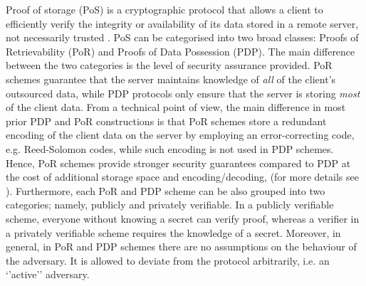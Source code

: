 Proof of storage (PoS) is a cryptographic protocol that allows a client to  efficiently verify the integrity or availability of its  data stored in a remote server, not necessarily trusted \cite{DBLP:conf/cai/Kamara13}. PoS  can be categorised into two broad classes:   Proofs of Retrievability (PoR) and Proofs of Data Possession (PDP). The main difference between the two categories is the level of security assurance provided. PoR schemes guarantee that the server maintains knowledge of \emph{all} of the client's outsourced data, while  PDP protocols only ensure that the server is storing \emph{most} of the client data. From a technical point of view,  the main difference in most prior PDP and PoR constructions is that PoR schemes store a redundant encoding of the client data on the server by employing an error-correcting code, e.g. Reed-Solomon codes, while such encoding is not used in  PDP schemes. Hence, PoR schemes provide stronger security guarantees compared to PDP at the  cost of additional storage space and encoding/decoding, (for more details see \cite{kupcu2010efficient,DBLP:conf/ccs/ShiSP13,Cash:2017:DPR:3038037.3038087}). Furthermore, each PoR and PDP scheme can be also grouped into two categories; namely, publicly and privately verifiable. In a publicly verifiable scheme, everyone without knowing a secret can verify  proof, whereas a verifier in a privately verifiable scheme requires the knowledge of a secret. Moreover, in general, in PoR  and PDP schemes there are no assumptions on the behaviour of the adversary. It is allowed to deviate from the protocol arbitrarily, i.e.  an ‘’active’’ adversary.






